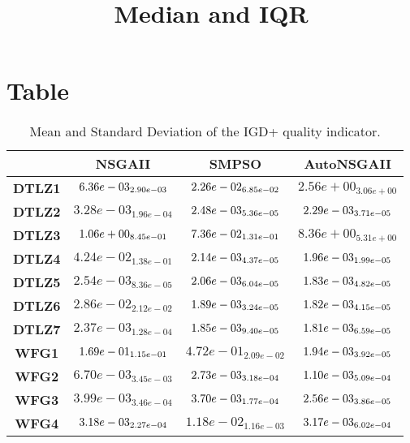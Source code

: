 \documentclass{article}
\title{Median and IQR}
\author{}
\begin{document}
\maketitle
\section{Table}
\begin{table}[!htp]
  \caption{Mean and Standard Deviation of the IGD+ quality indicator.}
  \label{table:IGD+}
  \centering
  \begin{scriptsize}
  \begin{tabular}{c|ccc}
      & \textbf{NSGAII} & \textbf{SMPSO} & \textbf{AutoNSGAII} \\\hline
      \textbf{DTLZ1} & $\cellcolor{gray95} 6.36e-03_{2.90e-03} $ & $ \cellcolor{gray25} 2.26e-02_{6.85e-02} $ & $ 2.56e+00_{3.06e+00}$ \\
      \textbf{DTLZ2} & $3.28e-03_{1.96e-04} $ & $ \cellcolor{gray25} 2.48e-03_{5.36e-05} $ & $ \cellcolor{gray95} 2.29e-03_{3.71e-05}$ \\
      \textbf{DTLZ3} & $\cellcolor{gray25} 1.06e+00_{8.45e-01} $ & $ \cellcolor{gray95} 7.36e-02_{1.31e-01} $ & $ 8.36e+00_{5.31e+00}$ \\
      \textbf{DTLZ4} & $4.24e-02_{1.38e-01} $ & $ \cellcolor{gray25} 2.14e-03_{4.37e-05} $ & $ \cellcolor{gray95} 1.96e-03_{1.99e-05}$ \\
      \textbf{DTLZ5} & $2.54e-03_{8.36e-05} $ & $ \cellcolor{gray25} 2.06e-03_{6.04e-05} $ & $ \cellcolor{gray95} 1.83e-03_{4.82e-05}$ \\
      \textbf{DTLZ6} & $2.86e-02_{2.12e-02} $ & $ \cellcolor{gray25} 1.89e-03_{3.24e-05} $ & $ \cellcolor{gray95} 1.82e-03_{4.15e-05}$ \\
      \textbf{DTLZ7} & $2.37e-03_{1.28e-04} $ & $ \cellcolor{gray25} 1.85e-03_{9.40e-05} $ & $ \cellcolor{gray95} 1.81e-03_{6.59e-05}$ \\
      \textbf{WFG1} & $\cellcolor{gray25} 1.69e-01_{1.15e-01} $ & $ 4.72e-01_{2.09e-02} $ & $ \cellcolor{gray95} 1.94e-03_{3.92e-05}$ \\
      \textbf{WFG2} & $6.70e-03_{3.45e-03} $ & $ \cellcolor{gray25} 2.73e-03_{3.18e-04} $ & $ \cellcolor{gray95} 1.10e-03_{5.09e-04}$ \\
      \textbf{WFG3} & $3.99e-03_{3.46e-04} $ & $ \cellcolor{gray25} 3.70e-03_{1.77e-04} $ & $ \cellcolor{gray95} 2.56e-03_{3.86e-05}$ \\
      \textbf{WFG4} & $\cellcolor{gray25} 3.18e-03_{2.27e-04} $ & $ 1.18e-02_{1.16e-03} $ & $ \cellcolor{gray95} 3.17e-03_{6.02e-04}$ \\

\end{tabular}
\end{scriptsize}
\end{table}
\end{document}
